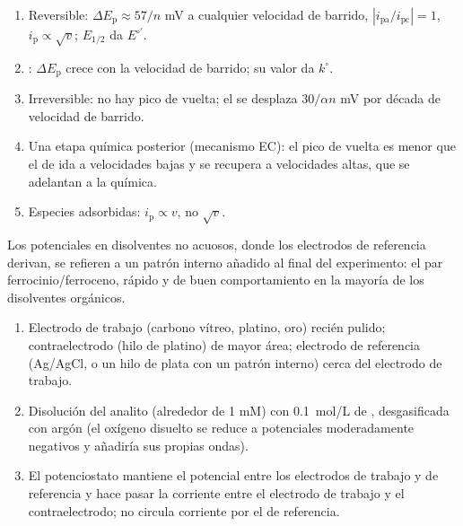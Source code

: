 \begin{method}\label{met:b3:electrode-kinetics:cv-diagnosis}
\begin{enumerate}
  \item Reversible: $\Delta E_{\mathrm p} \approx 57/n$ mV a cualquier velocidad de barrido, $|i_{\mathrm{pa}}/i_{\mathrm{pc}}| = 1$, $i_{\mathrm p} \propto \sqrt v$;
        $E_{1/2}$ da $E^{\circ\prime}$.
  \item {}: $\Delta E_{\mathrm p}$ crece con la velocidad de barrido; su valor da $k^\circ$.
  \item Irreversible: no hay pico de vuelta; el  se desplaza $30/\alpha n$ mV por
        década de velocidad de barrido.
  \item Una etapa química posterior (mecanismo EC): el pico de vuelta es menor que
        el de ida a velocidades bajas y se recupera a velocidades altas, que se adelantan a la
        química.
  \item Especies adsorbidas: $i_{\mathrm p} \propto v$, no $\sqrt v$.
\end{enumerate}
\end{method}

Los potenciales en disolventes no acuosos, donde los electrodos de referencia derivan, se
refieren a un patrón interno añadido al final del experimento: el
par ferrocinio/ferroceno, rápido y de buen comportamiento en la mayoría de los disolventes orgánicos.

\begin{method}\label{met:b3:electrode-kinetics:three-electrode}
\begin{enumerate}
  \item Electrodo de trabajo (carbono vítreo, platino, oro) recién pulido;
        contraelectrodo (hilo de platino) de mayor área; electrodo de referencia
        (Ag/AgCl, o un hilo de plata con un patrón interno) cerca del electrodo de
        trabajo.
  \item Disolución del analito (alrededor de 1 mM) con \qty{0.1}{mol/L} de , desgasificada con argón (el oxígeno disuelto se reduce a potenciales
        moderadamente negativos y añadiría sus propias ondas).
  \item El potenciostato mantiene el potencial entre los electrodos de trabajo y de referencia
        y hace pasar la corriente entre el electrodo de trabajo y el
        contraelectrodo; no circula corriente por el de referencia.
\end{enumerate}
\end{method}

